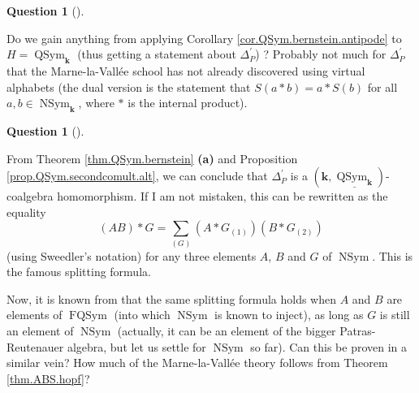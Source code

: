 \documentclass
[numbers=enddot,12pt,final,onecolumn,notitlepage,abstracton]{scrartcl}%
\theoremstyle{definition}
\newtheorem{quest}[theo]{Question}
\newenvironment{question}[1][]
{\begin{quest}[#1]\begin{leftbar}}
{\end{leftbar}\end{quest}}
\newenvironment{question}[1][Question]{\noindent\textbf{#1.} }{\ \rule{0.5em}{0.5em}}
\let\sumnonlimits\sum
\renewcommand{\sum}{\sumnonlimits\limits}
\begin{document}
\begin{question}
\label{quest.relhopf}Do we gain anything from applying Corollary
\ref{cor.QSym.bernstein.antipode} to $H=\operatorname*{QSym}%
\nolimits_{\mathbf{k}}$ (thus getting a statement about $\Delta_{P}^{\prime}$)
? Probably not much for $\Delta_{P}^{\prime}$ that the Marne-la-Vall\'{e}e
school has not already discovered using virtual alphabets (the dual version is
the statement that $S\left(  a\ast b\right)  =a\ast S\left(  b\right)  $ for
all $a,b\in\operatorname*{NSym}\nolimits_{\mathbf{k}}$, where $\ast$ is the
internal product).
\end{question}

\begin{question}
\label{quest.split}From Theorem \ref{thm.QSym.bernstein} \textbf{(a)} and
Proposition \ref{prop.QSym.secondcomult.alt}, we can conclude that $\Delta
_{P}^{\prime}$ is a $\left(  \mathbf{k},\underline{\operatorname*{QSym}%
\nolimits_{\mathbf{k}}}\right)  $-coalgebra homomorphism. If I am not
mistaken, this can be rewritten as the equality%
\[
\left(  AB\right)  \ast G=\sum_{\left(  G\right)  }\left(  A\ast G_{\left(
1\right)  }\right)  \left(  B\ast G_{\left(  2\right)  }\right)
\]
(using Sweedler's notation) for any three elements $A$, $B$ and $G$ of
$\operatorname*{NSym}$. This is the famous splitting formula.

Now, it is known from \cite[\S 7]{NCSF7} that the same splitting formula holds
when $A$ and $B$ are elements of $\operatorname*{FQSym}$ (into which
$\operatorname*{NSym}$ is known to inject), as long as $G$ is still an element
of $\operatorname*{NSym}$ (actually, it can be an element of the bigger
Patras-Reutenauer algebra, but let us settle for $\operatorname*{NSym}$ so
far). Can this be proven in a similar vein? How much of the
Marne-la-Vall\'{e}e theory follows from Theorem \ref{thm.ABS.hopf}?
\end{question}
\end{document}
